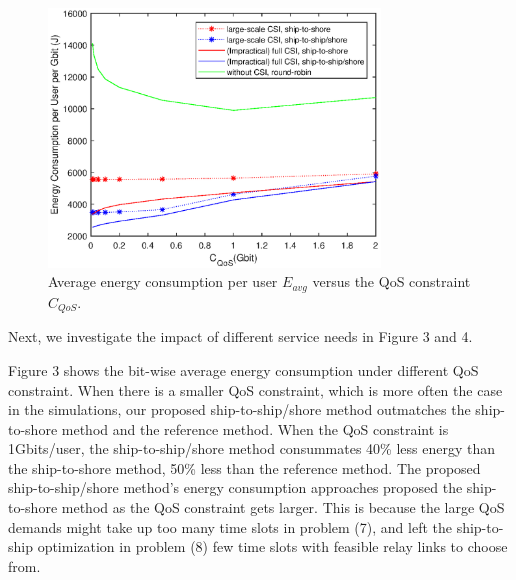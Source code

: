 \documentclass[conference]{IEEEtran}
\begin{document}
\begin{figure} [htb]
\begin{center}
\includegraphics*[width=8.8cm]{Cqos.eps}
\end{center}
\vspace*{-4mm} 
\caption{Average energy consumption per user $E_{avg}$ versus the QoS constraint ${C_{QoS}}$.}\label{fig:3}
\vspace*{-2mm} 
\end{figure}



Next, we investigate the impact of different service needs in Figure 3 and 4. 

Figure 3 shows the bit-wise average energy consumption under different QoS constraint.
When there is a smaller QoS constraint, which is more often the case in the simulations, our proposed ship-to-ship/shore method outmatches the ship-to-shore method and the reference method. When the QoS constraint is 1Gbits/user, the ship-to-ship/shore method consummates 40\% less energy than the ship-to-shore method, 50\% less than the reference method. The proposed ship-to-ship/shore method's energy consumption approaches proposed the ship-to-shore method as the QoS constraint gets larger. This is because the large QoS demands might take up too many time slots in problem (7), and left the ship-to-ship optimization in problem (8) few time slots with feasible relay links to choose from.
\end{document}
